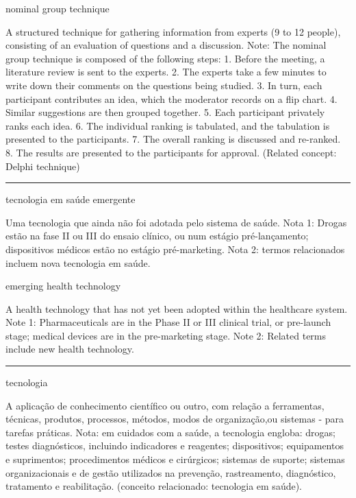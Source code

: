 \documentclass[
]{book}
\begin{document}
nominal group technique

A structured technique for gathering information from experts (9 to 12 people), consisting of an evaluation of questions and a discussion. Note: The nominal group technique is composed of the following steps:
1. Before the meeting, a literature review is sent to the experts.
2. The experts take a few minutes to write down their comments on the questions being studied.
3. In turn, each participant contributes an idea, which the moderator records on a flip chart.
4. Similar suggestions are then grouped together.
5. Each participant privately ranks each idea.
6. The individual ranking is tabulated, and the tabulation is presented to the participants.
7. The overall ranking is discussed and re-ranked.
8. The results are presented to the participants for approval. (Related concept: Delphi technique)

\begin{center}\rule{0.5\linewidth}{0.5pt}\end{center}

tecnologia em saúde emergente

Uma tecnologia que ainda não foi adotada pelo sistema de saúde. Nota 1: Drogas estão na fase II ou III do ensaio clínico, ou num estágio pré-lançamento; dispositivos médicos estão no estágio pré-marketing. Nota 2: termos relacionados incluem nova tecnologia em saúde.

emerging health technology

A health technology that has not yet been adopted within the healthcare system. Note 1: Pharmaceuticals are in the Phase II or III clinical trial, or pre-launch stage; medical devices are in the pre-marketing stage. Note 2: Related terms include new health technology.

\begin{center}\rule{0.5\linewidth}{0.5pt}\end{center}

tecnologia

A aplicação de conhecimento científico ou outro, com relação a ferramentas, técnicas, produtos, processos, métodos, modos de organização,ou sistemas - para tarefas práticas. Nota: em cuidados com a saúde, a tecnologia engloba: drogas; testes diagnósticos, incluindo indicadores e reagentes; dispositivos; equipamentos e suprimentos; procedimentos médicos e cirúrgicos; sistemas de suporte; sistemas organizacionais e de gestão utilizados na prevenção, rastreamento, diagnóstico, tratamento e reabilitação. (conceito relacionado: tecnologia em saúde).
\end{document}
